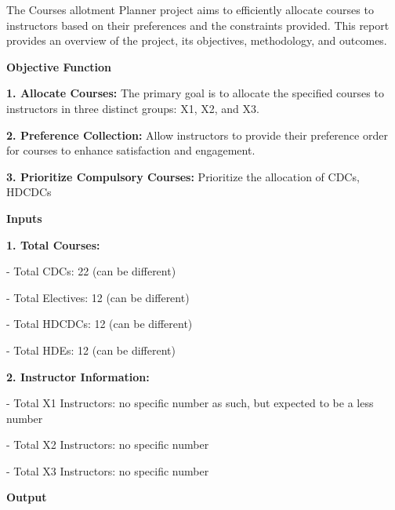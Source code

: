 \documentclass{article} %
\begin{document}
\noindent \textbf{\underbar{}}

\noindent \textbf{}

\noindent The Courses allotment Planner project aims to efficiently allocate courses to instructors based on their preferences and the constraints provided. This report provides an overview of the project, its objectives, methodology, and outcomes.

\noindent 

\noindent \textbf{}

\noindent 

\noindent \textbf{Objective Function}

\noindent \textbf{1. Allocate Courses:} The primary goal is to allocate the specified courses to instructors in three distinct groups: X1, X2, and X3.

\noindent \textbf{2. Preference Collection:} Allow instructors to provide their preference order for courses to enhance satisfaction and engagement.

\noindent \textbf{3. Prioritize Compulsory Courses:} Prioritize the allocation of CDCs, HDCDCs

\noindent 

\noindent \textbf{Inputs}

\noindent \textbf{1. Total Courses: }

\noindent     - Total CDCs: 22 (can be different)

\noindent     - Total Electives: 12 (can be different)

\noindent     - Total HDCDCs: 12 (can be different)

\noindent     - Total HDEs: 12 (can be different)

\noindent 

\noindent \textbf{2. Instructor Information:}

\noindent     - Total X1 Instructors: no specific number as such, but expected to be a less number

\noindent     - Total X2 Instructors: no specific number

\noindent     - Total X3 Instructors: no specific number

\noindent 

\noindent 

\noindent 

\noindent 

\noindent 

\noindent  \textbf{Output}
\end{document}

